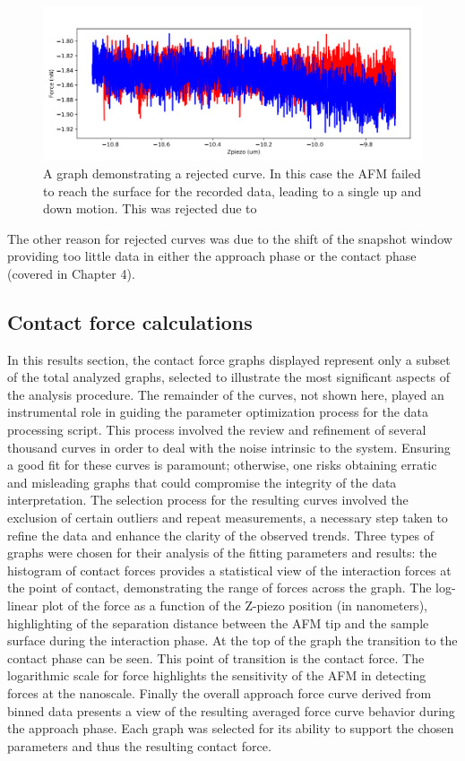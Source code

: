 \begin{figure}
    \centering
    \includegraphics[width=0.75\linewidth]{chapter5/miss_error.png}
    \caption{A graph demonstrating a rejected curve. In this case the AFM failed to reach the surface for the recorded data, leading to a single up and down motion. This was rejected due to }
    \label{fig:miss-error}
\end{figure}

The other reason for rejected curves was due to the shift of the snapshot window providing too little data in either the approach phase or the contact phase (covered in Chapter 4). 

\subsection{Contact force calculations}

In this results section, the contact force graphs displayed represent only a subset of the total analyzed graphs, selected to illustrate the most significant aspects of the analysis procedure. The remainder of the curves, not shown here, played an instrumental role in guiding the parameter optimization process for the data processing script. This process involved the review and refinement of several thousand curves in order to deal with the noise intrinsic to the system. Ensuring a good fit for these curves is paramount; otherwise, one risks obtaining erratic and misleading graphs that could compromise the integrity of the data interpretation. The selection process for the resulting curves involved the exclusion of certain outliers and repeat measurements, a necessary step taken to refine the data and enhance the clarity of the observed trends. Three types of graphs were chosen for their analysis of the fitting parameters and results: the histogram of contact forces provides a statistical view of the interaction forces at the point of contact, demonstrating the range of forces across the graph. The log-linear plot of the force as a function of the Z-piezo position (in nanometers), highlighting of the separation distance between the AFM tip and the sample surface during the interaction phase. At the top of the graph the transition to the contact phase can be seen. This point of transition is the contact force. The logarithmic scale for force highlights the sensitivity of the AFM in detecting forces at the nanoscale. Finally the overall approach force curve derived from binned data presents a view of the resulting averaged force curve behavior during the approach phase. Each graph was selected for its ability to support the chosen parameters and thus the resulting contact force.


